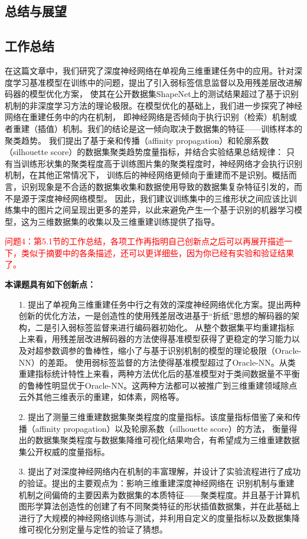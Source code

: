 \documentclass[bachelor, nocolorlinks, printoneside]{seuthesis} %
\newcommand\COMM[1]{\textcolor{red}{#1}}
\begin{document}
\begin{Main}
\chapter{总结与展望}

\section{工作总结}
在这篇文章中，我们研究了深度神经网络在单视角三维重建任务中的应用。针对深度学习基准模型在训练中的问题，提出了引入弱标签信息监督以及用残差层改进解码器的模型优化方案，
使其在公开数据集ShapeNet上的测试结果超过了基于识别机制的非深度学习方法的理论极限。在模型优化的基础上，我们进一步探究了神经网络在重建任务中的内在机制，
即神经网络是否倾向于执行识别（检索）机制或者重建（插值）机制。我们的结论是这一倾向取决于数据集的特征——训练样本的聚类趋势。
我们提出了基于亲和传播（affinity propagation）和轮廓系数（silhouette score）的数据集聚类趋势度量指标，并结合实验结果总结规律：
只有当训练形状集的聚类程度高于训练图片集的聚类程度时，神经网络才会执行识别机制，在其他正常情况下，
训练后的神经网络更倾向于重建而不是识别。概括而言，识别现象是不合适的数据集收集和数据使用导致的数据集复杂特征引发的，而不是源于深度神经网络模型。
因此，我们建议训练集中的三维形状之间应该比训练集中的图片之间呈现出更多的差异，以此来避免产生一个基于识别的机器学习模型，这为三维数据集的收集以及三维重建训练提供了指导。

\COMM{问题4：第5.1节的工作总结，各项工作再指明自己创新点之后可以再展开描述一下，类似于摘要中的各条描述，还可以更详细些，因为你已经有实验和验证结果了。}

\noindent
\textbf{本课题具有如下创新点：}
\begin{itemize}
    \item[1.] 提出了单视角三维重建任务中行之有效的深度神经网络优化方案。提出两种创新的优化方法，一是创造性的使用残差层改进基于“折纸”思想的解码器的架构，二是引入弱标签监督来进行编码器初始化。
    从整个数据集平均重建指标上来看，用残差层改进解码器的方法使得基准模型获得了更稳定的学习能力以及对超参数调参的鲁棒性，缩小了与基于识别机制的模型的理论极限（Oracle-NN）的差距。
    使用弱标签监督的方法使得基准模型超过了Oracle-NN。从类重建指标统计特性上来看，两种方法优化后的基准模型对于类间数据量不平衡的鲁棒性明显优于Oracle-NN。这两种方法都可以被推广到三维重建领域除点云外其他三维表示的重建，如体素，网格等。
    \item[2.] 提出了测量三维重建数据集聚类程度的度量指标。该度量指标借鉴了亲和传播（affinity propagation）以及轮廓系数（silhouette score）的方法，
    衡量得出的数据集聚类程度与数据集降维可视化结果吻合，有希望成为三维重建数据集公开权威的度量指标。
    \item[3.] 提出了对深度神经网络内在机制的丰富理解，并设计了实验流程进行了成功的验证。提出的主要观点为：影响三维重建深度神经网络在
    识别机制与重建机制之间偏倚的主要因素为数据集的本质特征——聚类程度。并且基于计算机图形学算法创造性的创建了有不同聚类特征的形状插值数据集，并在此基础上
    进行了大规模的神经网络训练与测试，并利用自定义的度量指标以及数据集降维可视化分别定量与定性的验证了猜想。
\end{itemize}


\end{Main}
\end{document}
